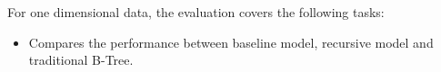For one dimensional data, the evaluation covers the following tasks:

\begin{itemize}
	\item Compares the performance between baseline model, recursive model and traditional B-Tree.
\end{itemize}